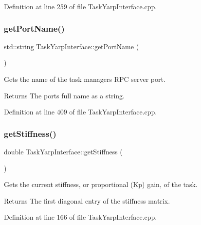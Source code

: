 Definition at line 259 of file Task\+Yarp\+Interface.\+cpp.

\hypertarget{classocra_1_1TaskYarpInterface_a9b8f66267bb3a92b4d5bf3e2154fd27d}{}\label{classocra_1_1TaskYarpInterface_a9b8f66267bb3a92b4d5bf3e2154fd27d} 
\subsubsection{\texorpdfstring{get\+Port\+Name()}{getPortName()}}
{\footnotesize\ttfamily std\+::string Task\+Yarp\+Interface\+::get\+Port\+Name (\begin{DoxyParamCaption}{ }\end{DoxyParamCaption})}

Gets the name of the task manager\textquotesingle{}s R\+PC server port.

\begin{DoxyReturn}{Returns}
The port\textquotesingle{}s full name as a string. 
\end{DoxyReturn}


Definition at line 409 of file Task\+Yarp\+Interface.\+cpp.

\hypertarget{classocra_1_1TaskYarpInterface_ac8fe0e816f2ded6c2280ee0fef70ae54}{}\label{classocra_1_1TaskYarpInterface_ac8fe0e816f2ded6c2280ee0fef70ae54} 
\subsubsection{\texorpdfstring{get\+Stiffness()}{getStiffness()}}
{\footnotesize\ttfamily double Task\+Yarp\+Interface\+::get\+Stiffness (\begin{DoxyParamCaption}{ }\end{DoxyParamCaption})}

Gets the current stiffness, or proportional (Kp) gain, of the task.

\begin{DoxyReturn}{Returns}
The first diagonal entry of the stiffness matrix. 
\end{DoxyReturn}


Definition at line 166 of file Task\+Yarp\+Interface.\+cpp.

